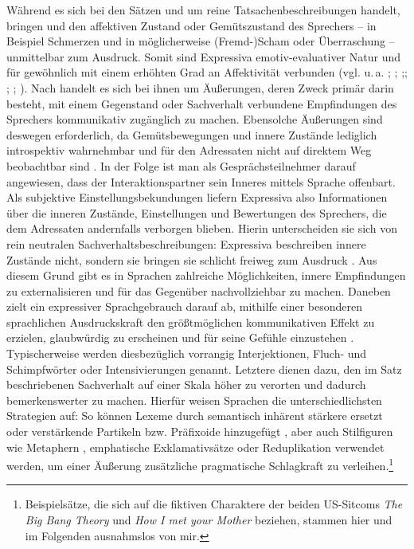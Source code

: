 \noindent Während es sich bei den Sätzen  und  um reine Tatsachenbeschreibungen handelt, bringen  und  den affektiven Zustand oder Gemütszustand des Sprechers -- in Beispiel  Schmerzen und in  möglicherweise \mbox{(Fremd-)}Scham oder Überraschung -- unmittelbar zum Ausdruck. Somit sind Expressiva emotiv-evaluativer Natur und für gewöhnlich mit einem erhöhten Grad an Affektivität verbunden (vgl. u.\,a. \citealt[274]{Cruse.1986}; \citealt[189]{Kirschbaum.2002b}; \citealt[44f.]{Loebner.2002};; \citealt[]{Athanasiadou.2007}; \citealt[10]{Gutzmann.2015a}; \citealt[1]{dAvis.2019b}). Nach \citet[151]{Zifonun.1997} handelt es sich bei ihnen um \glqq{}Äußerungen, deren Zweck primär darin besteht, mit einem Gegenstand oder Sachverhalt verbundene Empfindungen des Sprechers kommunikativ zugänglich zu machen\grqq{}. Ebensolche Äußerungen sind deswegen erforderlich, da Gemütsbewegungen und innere Zustände lediglich introspektiv wahrnehmbar und für den Adressaten nicht auf direktem Weg beobachtbar sind {\citep[vgl.][44]{Schwarz-Friesel.2013}}. In der Folge ist man als Gesprächsteilnehmer darauf angewiesen, dass der Interaktionspartner sein Inneres mittels Sprache offenbart. Als subjektive Einstellungsbekundungen liefern Expressiva also Informationen über die inneren Zustände, Einstellungen und Bewertungen des Sprechers, die dem Adressaten andernfalls verborgen blieben. Hierin unterscheiden sie sich von rein neutralen Sachverhaltsbeschreibungen: Expressiva beschreiben innere Zustände nicht, sondern sie bringen sie schlicht freiweg zum Ausdruck {\citep[vgl.][485]{Gutzmann.2018}}. Aus diesem Grund gibt es in Sprachen zahlreiche Möglichkeiten, innere Empfindungen zu externalisieren und für das Gegenüber nachvollziehbar zu machen. Daneben zielt ein expressiver Sprachgebrauch darauf ab, mithilfe einer besonderen sprachlichen Ausdruckskraft den größtmöglichen kommunikativen Effekt zu erzielen, glaubwürdig zu erscheinen und für seine Gefühle einzustehen {\citep[vgl.][189ff.]{Kirschbaum.2002b}}. Typischerweise werden diesbezüglich vorrangig Interjektionen, Fluch- und Schimpfwörter oder Intensivierungen genannt. Letztere dienen dazu, den im Satz beschriebenen Sachverhalt auf einer Skala höher zu verorten und dadurch bemerkenswerter zu machen. Hierfür weisen Sprachen die unterschiedlichsten Strategien auf: So können Lexeme durch semantisch inhärent stärkere ersetzt  oder verstärkende Partikeln bzw. Präfixoide hinzugefügt , aber auch Stilfiguren wie Metaphern , emphatische Exklamativsätze  oder Reduplikation  verwendet werden, um einer Äußerung zusätzliche pragmatische Schlagkraft zu verleihen.\footnote{Beispielsätze, die sich auf die fiktiven Charaktere der beiden US-Sitcoms \textit{The Big Bang Theory} und \textit{How I met your Mother} beziehen, stammen hier und im Folgenden ausnahmslos von mir.}

